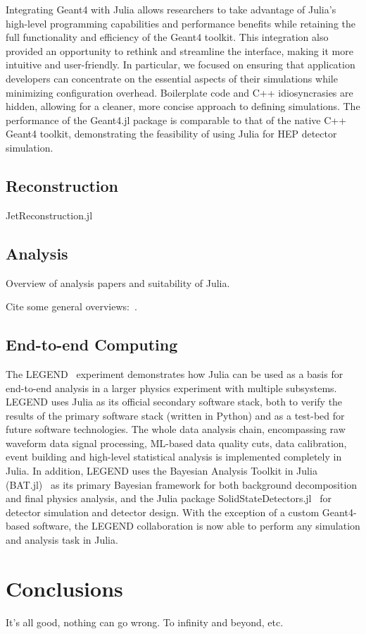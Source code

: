 \documentclass{webofc}
\begin{document}
Integrating Geant4 with Julia allows researchers to take advantage of Julia's
high-level programming capabilities and performance benefits while retaining the
full functionality and efficiency of the Geant4 toolkit. This integration also
provided an opportunity to rethink and streamline the interface, making it more
intuitive and user-friendly. In particular, we focused on ensuring that
application developers can concentrate on the essential aspects of their
simulations while minimizing configuration overhead. Boilerplate code and C++
idiosyncrasies are hidden, allowing for a cleaner, more concise approach to
defining simulations. The performance of the Geant4.jl package is comparable to
that of the native C++ Geant4 toolkit, demonstrating the feasibility of using
Julia for HEP detector simulation.

\subsection{Reconstruction}

JetReconstruction.jl

\subsection{Analysis}

Overview of analysis papers and suitability of Julia.

Cite some general overviews:~\cite{Stanitzki:2020bnx,eschle2023potential}.

\subsection{End-to-end Computing}

The LEGEND~\cite{LEGEND:2017AIPC} experiment demonstrates how Julia can be used
as a basis for end-to-end analysis in a larger physics experiment with multiple
subsystems. LEGEND uses Julia as its official secondary software stack, both to
verify the results of the primary software stack (written in Python) and as a
test-bed for future software technologies. The whole data analysis chain,
encompassing raw waveform data signal processing, ML-based data quality cuts,
data calibration, event building and high-level statistical analysis is
implemented completely in Julia. In addition, LEGEND uses the Bayesian Analysis
Toolkit in Julia (BAT.jl)~\cite{Schulz:2021BAT} as its primary Bayesian
framework for both background decomposition and final physics analysis, and the
Julia package SolidStateDetectors.jl~\cite{Abt:2021SSD} for detector simulation
and detector design. With the exception of a custom Geant4-based software, the
LEGEND collaboration is now able to perform any simulation and analysis task in
Julia.


\section{Conclusions}

It's all good, nothing can go wrong. To infinity and beyond, etc.

\sloppy
\raggedright

\end{document}
